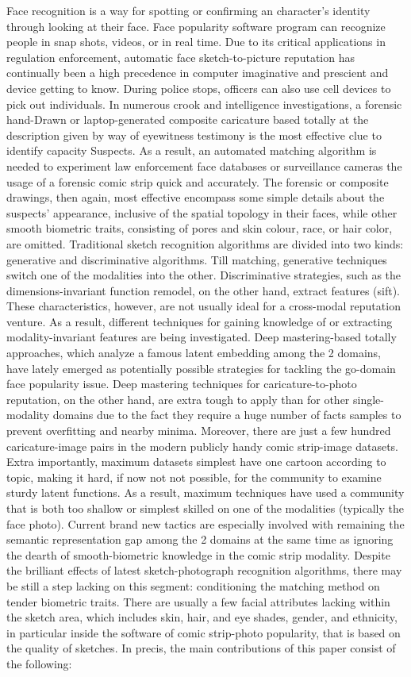 \documentclass[journal]{IEEEtran} %
\begin{document}
 Face recognition is a way for spotting or confirming an character's identity through looking at their face. Face popularity software program can recognize people in snap shots, videos, or in real time. Due to its critical applications in regulation enforcement, automatic face sketch-to-picture reputation has continually been a high precedence in computer imaginative and prescient and device getting to know. During police stops, officers can also use cell devices to pick out individuals. In numerous crook and intelligence investigations, a forensic hand-Drawn or laptop-generated composite caricature based totally at the description given by way of eyewitness testimony is the most effective clue to identify capacity   Suspects. As a result, an automated matching algorithm is needed to experiment law enforcement face databases or surveillance cameras the usage of a forensic comic strip quick and accurately. The forensic or composite drawings, then again, most effective encompass some simple details about the suspects' appearance, inclusive of the spatial topology in their faces, while other smooth biometric traits, consisting of pores and skin colour, race, or hair color, are omitted. Traditional sketch recognition algorithms are divided into two kinds: generative and discriminative algorithms. Till matching, generative techniques switch one of the modalities into the other. Discriminative strategies, such as the dimensions-invariant function remodel, on the other hand, extract features (sift). These characteristics, however, are not usually ideal for a cross-modal reputation venture. As a result, different techniques for gaining knowledge of or extracting modality-invariant features are being investigated. Deep mastering-based totally approaches, which analyze a famous latent embedding among the 2 domains, have lately emerged as potentially possible strategies for tackling the go-domain face popularity issue. Deep mastering techniques for caricature-to-photo reputation, on the other hand, are extra tough to apply than for other single-modality domains due to the fact they require a huge number of facts samples to prevent overfitting and nearby minima. Moreover, there are just a few hundred caricature-image pairs in the modern publicly handy comic strip-image datasets. Extra importantly, maximum datasets simplest have one cartoon according to topic, making it hard, if now not not possible, for the community to examine sturdy latent functions. As a result, maximum techniques have used a community that is both too shallow or simplest skilled on one of the modalities (typically the face photo). Current brand new tactics are especially involved with remaining the semantic representation gap among the 2 domains at the same time as ignoring the dearth of smooth-biometric knowledge in the comic strip modality. Despite the brilliant effects of latest sketch-photograph recognition algorithms, there may be still a step lacking on this segment: conditioning the matching method on tender biometric traits. There are usually a few facial attributes lacking within the sketch area, which includes skin, hair, and eye shades, gender, and ethnicity, in particular inside the software of comic strip-photo popularity, that is based on the quality of sketches. In precis, the main contributions of this paper consist of the following:
\end{document}
